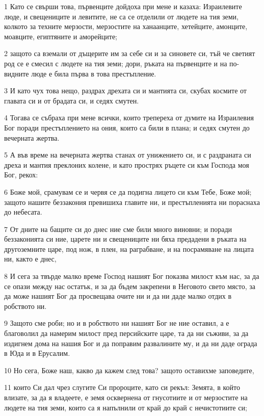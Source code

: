 \par 1 Като се свърши това, първенците дойдоха при мене и казаха: Израилевите люде, и свещениците и левитите, не са се отделили от людете на тия земи, колкото за техните мерзости, мерзостите на ханаанците, хетейците, амонците, моавците, египтяните и аморейците;
\par 2 защото са вземали от дъщерите им за себе си и за синовете си, тъй че светият род се е смесил с людете на тия земи; дори, ръката на първенците и на по-видните люде е била първа в това престъпление.
\par 3 И като чух това нещо, раздрах дрехата си и мантията си, скубах космите от главата си и от брадата си, и седях смутен.
\par 4 Тогава се събраха при мене всички, които трепереха от думите на Израилевия Бог поради престъплението на ония, които са били в плана; и седях смутен до вечерната жертва.
\par 5 А във време на вечерната жертва станах от унижението си, и с раздраната си дреха и мантия преклоних колене, и като прострях ръцете си към Господа моя Бог, рекох:
\par 6 Боже мой, срамувам се и червя се да подигна лицето си към Тебе, Боже мой; защото нашите беззакония превишиха главите ни, и престъпленията ни пораснаха до небесата.
\par 7 От дните на бащите си до днес ние сме били много виновни; и поради беззаконията си ние, царете ни и свещениците ни бяха предадени в ръката на другоземните царе, под нож, в плен, на раграбване, и на посрамяване на лицата ни, както е днес,
\par 8 И сега за твърде малко време Господ нашият Бог показва милост към нас, за да се опази между нас остатък, и за да бъдем закрепени в Неговото свето място, за да може нашият Бог да просвещава очите ни и да ни даде малко отдих в робството ни.
\par 9 Защото сме роби; но и в робството ни нашият Бог не ние оставил, а е благоволил да намерим милост пред персийските царе, та да ни съживи, за да издигнем дома на нашия Бог и да поправим развалините му, и да ни даде ограда в Юда и в Ерусалим.
\par 10 Но сега, Боже наш, какво да кажем след това? защото оставихме заповедите,
\par 11 които Си дал чрез слугите Си пророците, като си рекъл: Земята, в който влизате, за да я владеете, е земя осквернена от гнусотиите и от мерзостите на людете на тия земи, които са я напълнили от край до край с нечистотиите си;
